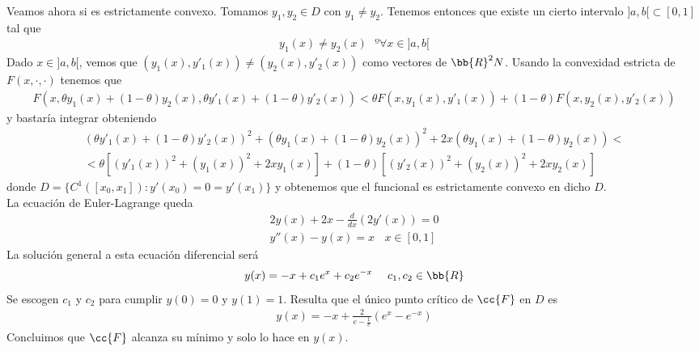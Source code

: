 \begin{ejemplo}
    Veamos ahora si es estrictamente convexo. Tomamos $y_1,y_2\in D$ con $y_1\neq y_2$. Tenemos entonces que existe un cierto intervalo $]a,b[\subset [0,1]$ tal que 
    \begin{gather*}
        y_1(x) \neq y_2(x) \ \ \ º \forall x \in ]a,b[
    \end{gather*}
    Dado $x\in ]a,b[$, vemos que $(y_1(x), y'_1(x)) \neq (y_2(x), y'_2(x))$ como vectores de $\bb{R}^2N$. Usando la convexidad estricta de $F(x,\cdot,\cdot)$ tenemos que 
    \begin{gather*}
        F(x, \theta y_1(x)+ (1-\theta) y_2(x), \theta y'_1(x)+ (1-\theta) y'_2(x)) < \theta F(x,y_1(x),y'_1(x)) + (1-\theta) F(x,y_2(x),y'_2(x))
    \end{gather*}
    y bastaría integrar obteniendo 
    \begin{gather*}
        (\theta y'_1(x) + (1-\theta)y'_2(x))^2 + (\theta y_1(x) + (1-\theta)y_2(x))^2 + 2x (\theta y_1(x) + (1-\theta) y_2(x)) <\\
        < \theta[(y'_1(x))^2 + (y_1(x))^2 + 2xy_1(x) ] + (1-\theta)[(y'_2(x))^2 + (y_2(x))^2 + 2xy_2(x) ]
    \end{gather*}
    donde $D=\{C^1([x_0, x_1]) : y'(x_0) = 0 = y'(x_1)\}$ y obtenemos que el funcional es estrictamente convexo en dicho $D$.\\

    La ecuación de Euler-Lagrange queda
    \begin{gather*}
        2y(x) + 2x - \frac{d}{dx}(2y'(x)) = 0\\
        y''(x) - y(x) = x \ \ \ \ x\in[0,1]
    \end{gather*}
    La solución general a esta ecuación diferencial será
    \begin{gather*}
        y(x) = -x + c_1e^x + c_2 e^{-x} \ \ \ \ c_1,c_2\in \bb{R}
    \end{gather*}
    Se escogen $c_1$ y $c_2$ para cumplir $y(0)=0$ y $y(1)=1$. Resulta que el único punto crítico de $\cc{F}$ en $D$ es 
    \begin{gather*}
        y(x) = -x + \frac{2}{e - \frac{1}{e}} (e^x - e^{-x})
    \end{gather*}
    Concluimos que $\cc{F}$ alcanza su mínimo y solo lo hace en $y(x)$.
\end{ejemplo}

